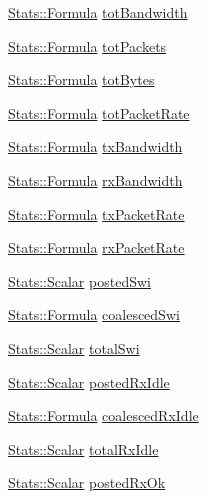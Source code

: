 \begin{DoxyCompactItemize}
\item 
\hyperlink{classStats_1_1Formula}{Stats::Formula} \hyperlink{classEtherDevice_a454c7ec55fb31ee9da4b76a6fbb2b50e}{totBandwidth}
\item 
\hyperlink{classStats_1_1Formula}{Stats::Formula} \hyperlink{classEtherDevice_a00d2133890f49cea4c0a2af7fad71cff}{totPackets}
\item 
\hyperlink{classStats_1_1Formula}{Stats::Formula} \hyperlink{classEtherDevice_a2ced08cd9d7714336f9231df4972f403}{totBytes}
\item 
\hyperlink{classStats_1_1Formula}{Stats::Formula} \hyperlink{classEtherDevice_ac8fc84a5011cf4dab066926170702470}{totPacketRate}
\item 
\hyperlink{classStats_1_1Formula}{Stats::Formula} \hyperlink{classEtherDevice_ae0b21ecd52636f2de4d476ef811b9318}{txBandwidth}
\item 
\hyperlink{classStats_1_1Formula}{Stats::Formula} \hyperlink{classEtherDevice_af24023ab80ef3ba1997474c9ff7346fe}{rxBandwidth}
\item 
\hyperlink{classStats_1_1Formula}{Stats::Formula} \hyperlink{classEtherDevice_ad2a16b3e606ae3ab1afdf0072bb2040f}{txPacketRate}
\item 
\hyperlink{classStats_1_1Formula}{Stats::Formula} \hyperlink{classEtherDevice_a6d72f73954f48c2153484dc3f268544b}{rxPacketRate}
\item 
\hyperlink{classStats_1_1Scalar}{Stats::Scalar} \hyperlink{classEtherDevice_acd22bd929d86896119b32f6f28e1c9d9}{postedSwi}
\item 
\hyperlink{classStats_1_1Formula}{Stats::Formula} \hyperlink{classEtherDevice_a695b00735209500501734e7d55b2adfd}{coalescedSwi}
\item 
\hyperlink{classStats_1_1Scalar}{Stats::Scalar} \hyperlink{classEtherDevice_a0b7f04d20ce33e586b42d2da6552dda9}{totalSwi}
\item 
\hyperlink{classStats_1_1Scalar}{Stats::Scalar} \hyperlink{classEtherDevice_af74842e5c37c931e3d1255af2a594e50}{postedRxIdle}
\item 
\hyperlink{classStats_1_1Formula}{Stats::Formula} \hyperlink{classEtherDevice_ab2027705b78ae507e1c3808dffe98f84}{coalescedRxIdle}
\item 
\hyperlink{classStats_1_1Scalar}{Stats::Scalar} \hyperlink{classEtherDevice_a0f9f603f5fa114cada7892e675d250bc}{totalRxIdle}
\item 
\hyperlink{classStats_1_1Scalar}{Stats::Scalar} \hyperlink{classEtherDevice_afc3132d29dbde408d9e286e1ab3680ec}{postedRxOk}
\item 

\end{DoxyCompactItemize}
